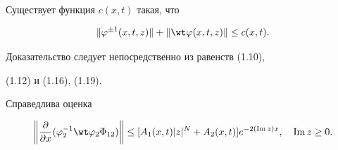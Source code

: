  


\begin{lems} Существует функция $c(x,t)$ такая, что 


$$ 


\|\varphi^{\pm 1}(x,t,z)\|+\|\wt\varphi(x,t,z)\|\le c(x,t). 


$$ 


\end{lems} 


 


Доказательство следует непосредственно из равенств (1.10), 


(1.12) и (1.16), (1.19). 


 


\begin{lems} Справедлива оценка 


\begin{equation} 


\bigg\|\myfrac{}{x}(\varphi^{-1}_2\wt\varphi_2\Phi_{12}) 


\bigg\|\le[A_1(x,t)|z|^N+A_2(x,t)] 


e^{-2(\im z)x},\quad \im z\ge 0. 


\end{equation} 


\end{lems} 


 


